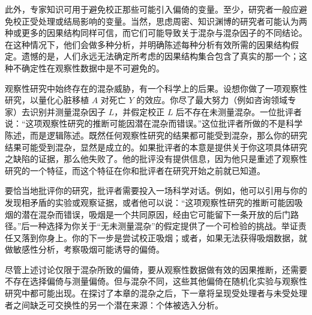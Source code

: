 此外，专家知识可用于避免校正那些可能引入偏倚的变量。至少，研究者一般应避免校正受处理或结局影响的变量。当然，思虑周密、知识渊博的研究者可能认为两种或更多的因果结构同样可信，而它们可能导致关于混杂与混杂因子的不同结论。在这种情况下，他们会做多种分析，并明确陈述每种分析有效所需的因果结构假定。遗憾的是，人们永远无法确定所考虑的因果结构集合包含了真实的那一个；这种不确定性在观察性数据中是不可避免的。

观察性研究中始终存在的混杂威胁，有一个科学上的后果。设想你做了一项观察性研究，以量化心脏移植 $A$ 对死亡 $Y$ 的效应。你尽了最大努力（例如咨询领域专家）去识别并测量混杂因子 $L$，并假定校正 $L$ 后不存在未测量混杂。一位批评者说：“这项观察性研究的推断可能因潜在混杂而错误。”这位批评者所做的不是科学陈述，而是逻辑陈述。既然任何观察性研究的结果都可能受到混杂，那么你的研究结果可能受到混杂，显然是成立的。如果批评者的本意是提供关于你这项具体研究之缺陷的证据，那么他失败了。他的批评没有提供信息，因为他只是重述了观察性研究的一个特征，而这个特征在你和批评者在研究开始之前就已知道。

要恰当地批评你的研究，批评者需要投入一场科学对话。例如，他可以引用与你的发现相矛盾的实验或观察证据，或者他可以说：“这项观察性研究的推断可能因吸烟的潜在混杂而错误，吸烟是一个共同原因，经由它可能留下一条开放的后门路径。”后一种选择为你关于“无未测量混杂”的假定提供了一个可检验的挑战。举证责任又落到你身上。你的下一步是尝试校正吸烟；或者，如果无法获得吸烟数据，就做敏感性分析，考察吸烟可能诱导的偏倚。

尽管上述讨论仅限于混杂所致的偏倚，要从观察性数据做有效的因果推断，还需要不存在选择偏倚与测量偏倚。但与混杂不同，这些其他偏倚在随机化实验与观察性研究中都可能出现。在探讨了本章的混杂之后，下一章将呈现受处理者与未受处理者之间缺乏可交换性的另一个潜在来源：个体被选入分析。

